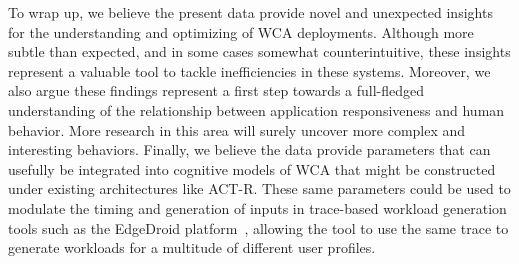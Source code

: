 To wrap up, we believe the present data provide novel and unexpected insights for the understanding and optimizing of WCA deployments.
Although more subtle than expected, and in some cases somewhat counterintuitive, these insights represent a valuable tool to tackle inefficiencies in these systems.
Moreover, we also argue these findings represent a first step towards a full-fledged understanding of the relationship between application responsiveness and human behavior.
More research in this area will surely uncover more complex and interesting behaviors.
Finally, we believe the data provide parameters that can usefully be integrated into cognitive models of WCA that might be constructed under existing architectures like ACT-R.
These same parameters could be used to modulate the timing and generation of inputs in trace-based workload generation tools such as the EdgeDroid platform~\cite{olguin:2018,olguin:2019}, allowing the tool to use the same trace to generate workloads for a multitude of different user profiles.


